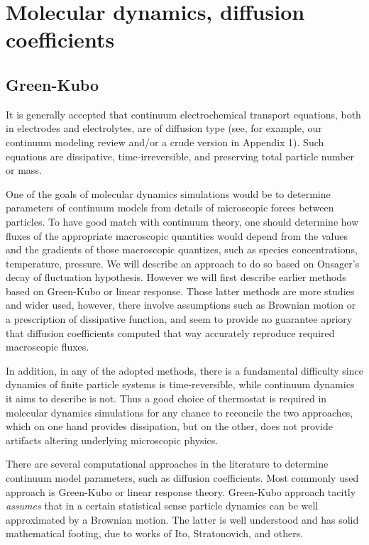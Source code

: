 \documentclass[a4paper, 11 pt]{article}
\theoremstyle{definition}
\theoremstyle{remark}
\begin{document}
\title{}
\author{Maxim Zyskin}
\date{October, 2020}






\section{Molecular dynamics, diffusion coefficients}
\subsection{Green-Kubo}
It is generally accepted that continuum electrochemical transport equations, both in electrodes and electrolytes, are of diffusion type (see, for example, our continuum modeling review and/or a crude version in Appendix 1). Such equations are dissipative, time-irreversible, and preserving total particle number or mass.

One of the goals of molecular dynamics simulations would be to determine parameters of continuum models from details of microscopic forces between particles. To have good match with continuum theory, one should determine how fluxes of the appropriate macroscopic quantities would depend from the values and the gradients of those macroscopic quantizes, such as species concentrations, temperature, pressure. We will describe an approach to do so based on Onsager's decay of fluctuation hypothesis. However we will first describe earlier methods based on  Green-Kubo or linear response.  Those latter methods are more studies and wider used, however, there involve assumptions such as Brownian motion or a prescription of dissipative function, and seem to provide no guarantee apriory  that diffusion coefficients computed that way accurately reproduce required macroscopic fluxes.


In addition, in any of the adopted methods, there is a fundamental difficulty since dynamics of finite particle systems is time-reversible, while continuum dynamics it aims to describe is not. Thus a good choice of thermostat is required in molecular dynamics simulations for any chance to reconcile the two approaches, which on one hand provides dissipation, but on the other, does not provide artifacts altering underlying microscopic physics.

There are several computational approaches in the literature to determine continuum model parameters, such as diffusion coefficients. Most commonly used approach is Green-Kubo or linear response theory. Green-Kubo approach tacitly {\it assumes} that in a certain statistical sense particle dynamics can be well approximated by a Brownian motion. The latter is well understood and has solid mathematical footing, due to works of Ito, Stratonovich, and others.
\end{document}
